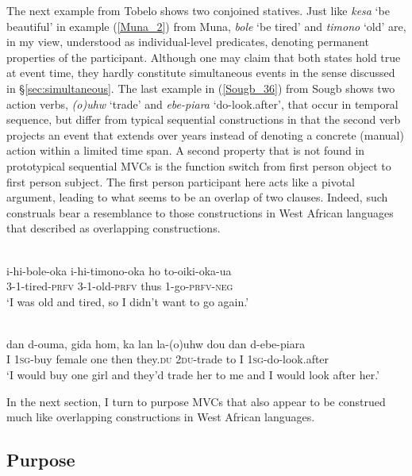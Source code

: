 The next example from Tobelo shows two conjoined statives. Just like \textit{kesa} `be beautiful' in example (\ref{Muna_2}) from Muna, \textit{bole} `be tired' and \textit{timono} `old' are, in my view, understood as individual-level predicates, denoting permanent properties of the participant. Although one may claim that both states hold true at event time, they hardly constitute simultaneous events in the sense discussed in §\ref{sec:simultaneous}. The last example in (\ref{Sougb_36}) from Sougb shows two action verbs, \textit{(o)uhw} `trade' and \textit{ebe-piara} `do-look.after', that occur in temporal sequence, but differ from typical sequential constructions in that the second verb projects an event that extends over years instead of denoting a concrete (manual) action within a limited time span. A second property that is not found in prototypical sequential MVCs is the function switch from first person object to first person subject. The first person participant here acts like a pivotal argument, leading to what seems to be an overlap of two clauses. Indeed, such construals bear a resemblance to those constructions in West African languages that \citet{ameka2005multiverb} described as overlapping constructions.

\ea 
{}\\
\gll i-hi-bole-oka i-hi-timono-oka ho to-oiki-oka-ua \\
3-1-tired-\textsc{prfv} 3-1-old-\textsc{prfv} thus 1-go-\textsc{prfv}-\textsc{neg} \\
\glft `I was old and tired, so I didn't want to go again.'\\ 
\z

\ea \label{Sougb_36}
\\
\gll dan d-ouma, gida hom, ka lan la-(o)uhw dou dan d-ebe-piara \\
I 1\textsc{sg}-buy female one then they.\textsc{du} 2\textsc{du}-trade to I 1\textsc{sg}-do-look.after \\
\glft `I would buy one girl and they'd trade her to me and I would look after her.'\\ 
\z

In the next section, I turn to purpose MVCs that also appear to be construed much like overlapping constructions in West African languages.

\subsection{Purpose} \label{sec:purpose}


